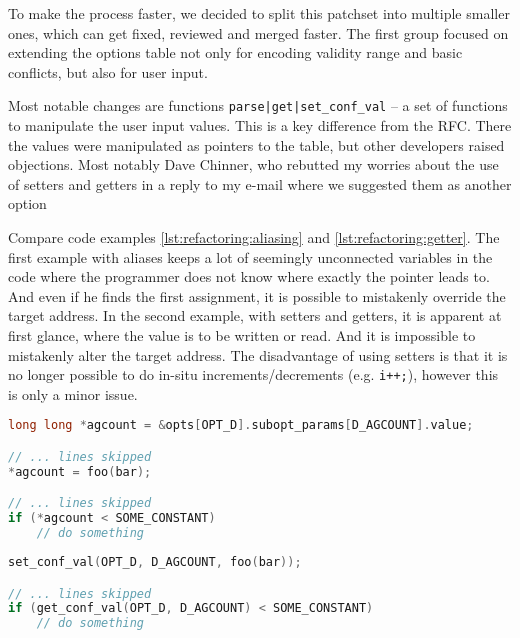 To make the process faster, we decided to split this patchset into multiple
smaller ones, which can get fixed, reviewed and merged faster. The first
group focused on extending the options table not only for encoding validity
range and basic conflicts, but also for user input.

Most notable changes are functions {\tt parse|get|set\_conf\_val}
-- a set of functions to manipulate the user input values. This is a key
difference from the RFC. There the values were manipulated as pointers to the
table, but other developers raised objections. Most notably Dave Chinner, who
rebutted my worries about the use of setters and getters in a reply to my
e-mail where we suggested them as another option~\cite{unifyTypes1, unifyTypes2}

Compare code examples \ref{lst:refactoring:aliasing} and
\ref{lst:refactoring:getter}.  The first example with aliases keeps a lot of
seemingly unconnected variables in the code where the programmer does not know
where exactly the pointer leads to. And even if he finds the first assignment,
it is possible to mistakenly override the target address. In the second
example, with setters and getters, it is apparent at first glance, where
the value is to be written or read. And it is impossible to mistakenly alter
the target address. The disadvantage of using setters is that it is no longer possible to do in-situ increments/decrements (e.g. {\tt i++;}), however this is only a minor issue.

\begin{lstlisting}[frame=none, basicstyle=\footnotesize\ttfamily,
language=C, numbers=none, numberstyle=\tiny\color{black},
label={lst:refactoring:aliasing},
caption={Pointer aliases in RFC of the second set.}]
long long *agcount = &opts[OPT_D].subopt_params[D_AGCOUNT].value;

// ... lines skipped
*agcount = foo(bar);

// ... lines skipped
if (*agcount < SOME_CONSTANT)
	// do something
\end{lstlisting}

\begin{lstlisting}[frame=none, basicstyle=\footnotesize\ttfamily,
language=C, numbers=none, numberstyle=\tiny\color{black},
label={lst:refactoring:getter},
caption={Setters and getters in later version of the second set.}]
set_conf_val(OPT_D, D_AGCOUNT, foo(bar));

// ... lines skipped
if (get_conf_val(OPT_D, D_AGCOUNT) < SOME_CONSTANT)
	// do something
\end{lstlisting}

